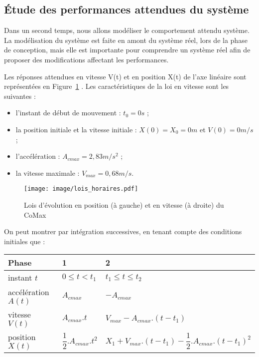 \vspace{5mm}

\subsection{Étude des performances attendues du système}
Dans un second temps, nous allons modéliser le comportement attendu système. La modélisation du système est faite en amont du système réel, lors de la phase de conception, mais elle est importante pour comprendre un système réel afin de proposer des modifications affectant les performances.

Les réponses attendues en vitesse V(t) et en position X(t) de l’axe linéaire sont représentées en Figure~\ref{lois_horaires} . Les caractéristiques de la loi en vitesse sont les suivantes :
\begin{itemize}
\item l’instant de début de mouvement : $t_0=0 s$ ;
\item la position initiale et la vitesse initiale : $X(0)=X_0=0 m$ et $V(0)=0 m/s$;
\item l’accélération : $A_{cmax}=2,83 m/s^2$ ;
\item la vitesse maximale : $V_{max}=0,68 m/s$.
\end{itemize}

\begin{figure}[!h]
\centering
\texttt{[image: image/lois\_horaires.pdf]}
\caption{Lois d'évolution en position (à gauche) et en vitesse (à droite) du CoMax}
\label{lois_horaires}
\end{figure}

On peut montrer par intégration successives, en tenant compte des conditions initiales que :

\vspace{0.5cm}
\begin{tabular}{|l|l|l|}
    \hline
     \textbf{Phase} &  \textbf{1} & \textbf{2}  \\
    \hline
     instant $t$  & $0\leq t <t_1$ & $t_1 \leq t \leq t_2$ \\
    \hline
     accélération $A(t)$  & $A_{cmax}$ & $-A_{cmax}$ \\
    \hline
     vitesse $V(t)$  & $A_{cmax}.t$ & $V_{max}-A_{cmax}.(t-t_1)$ \\
    \hline
     position $X(t)$  & $\dfrac{1}{2}.A_{cmax}.t^2$ & $X_1 + V_{max}.(t-t_1) - \dfrac{1}{2}.A_{cmax}.(t-t_1)^2$  \\
    \hline
\end{tabular}

